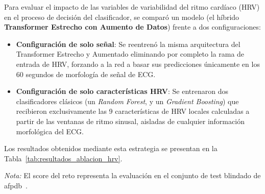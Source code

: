 Para evaluar el impacto de las variables de variabilidad del ritmo cardíaco (HRV) en el
proceso de decisión del clasificador, se comparó un modelo (el híbrido \textbf{Transformer Estrecho con
Aumento de Datos}) frente a dos configuraciones:
\begin{itemize}
    \item \textbf{Configuración de solo señal}: Se reentrenó la misma arquitectura del
    Transformer Estrecho y Aumentado eliminando por completo la rama de entrada de HRV,
    forzando a la red a basar sus predicciones únicamente en los 60 segundos de morfología de
    señal de ECG.
    \item \textbf{Configuración de solo características HRV}: Se entrenaron dos clasificadores clásicos
    (un \textit{Random Forest}, y un \textit{Gradient Boosting})
    que recibieron exclusivamente las
    9 características de HRV locales calculadas a partir de las ventanas de ritmo sinusal,
    aisladas de cualquier información morfológica del ECG.
\end{itemize}

Los resultados obtenidos mediante esta estrategia se presentan en la Tabla~\ref{tab:resultados_ablacion_hrv}.

\begin{table}[htbp]
  \centering
  \caption{Resultados del estudio de contribución de HRV frente al modelo híbrido completo}
  \label{tab:resultados_ablacion_hrv}
  \vskip 5pt
  \small
  \textit{Nota:} El score del reto representa la evaluación en el conjunto de test blindado de afpdb~\cite{moody_paf_2001}.
\end{table}

